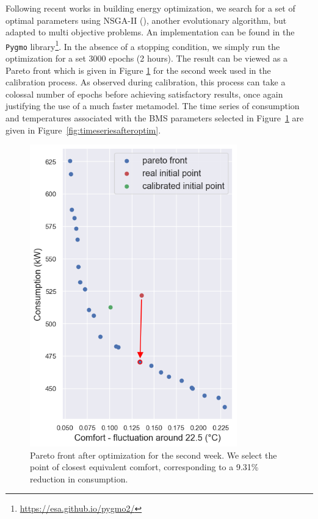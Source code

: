\documentclass[12pt]{article}
\begin{document}
Following recent works in building energy optimization, we search for a set of optimal parameters using NSGA-II (\cite{Deb2000AFE}), another evolutionary algorithm, but adapted to multi objective problems. An implementation can be found in the \texttt{Pygmo} library\footnote{\href{https://esa.github.io/pygmo2/}{https://esa.github.io/pygmo2/}}. In the absence of a stopping condition, we simply run the optimization for a set 3000 epochs (2 hours). The result can be viewed as a Pareto front which is given in Figure \ref{fig:pareto} for the second week used in the calibration process. As observed during calibration, this process can take a colossal number of epochs before achieving satisfactory results, once again justifying the use of a much faster metamodel. The time series of consumption and temperatures associated with the BMS parameters selected in Figure~\ref{fig:pareto} are given in Figure~\ref{fig:timeseriesafteroptim}.

\begin{figure}
    \centering
    \includegraphics[width=0.8\textwidth]{pareto_week2.png}
    \caption{Pareto front after optimization for the second week. We select the point of closest equivalent comfort, corresponding to a 9.31\% reduction in consumption.}
    \label{fig:pareto}
\end{figure}
\end{document}
